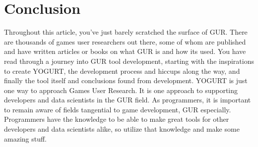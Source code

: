 \documentclass[journal]{IEEEtran}
\begin{document}




\section{Conclusion}
Throughout this article, you’ve just barely scratched the surface of GUR. There are thousands of games user researchers out there, some of whom are published and have written articles or books on what GUR is and how its used. You have read through a journey into GUR tool development, starting with the inspirations to create YOGURT, the development process and hiccups along the way, and finally the tool itself and conclusions found from development. YOGURT is just one way to approach Games User Research. It is one approach to supporting developers and data scientists in the GUR field. As programmers, it is important to remain aware of fields tangential to game development, GUR especially. Programmers have the knowledge to be able to make great tools for other developers and data scientists alike, so utilize that knowledge and make some amazing stuff.



%
\end{document}
